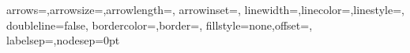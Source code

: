\newcommand{\VarLoopOff}{\RstLoopOffset \RstLoopSize \RstLoopAngle}
\newlength{\EdgeLineWid}
\setlength{\EdgeLineWid}{\EdgeLineWidth}
\newcommand{\EdgeLineSty}{\EdgeLineStyle}
\newcommand{\EdgeLineCol}{\EdgeLineColor}
\newcommand{\EdgeLabelSca}{1}
\newcommand{\EdgeLabelCol}{\EdgeLabelColor}
\newlength{\EdgeArrowSZDim}
\setlength{\EdgeArrowSZDim}{\EdgeArrowWidth}
\newcommand{\EdgeArrowSZNum}{\EdgeArrowLengthCoef}
\newcommand{\EdgeArrowSty}{\EdgeArrowStyle}
\newcommand{\EdgeArrowIns}{\EdgeArrowInset}
\newlength{\EdgeLineBord}\setlength{\EdgeLineBord}{0pt}
\newlength{\ZZSiZ}
\setlength{\ZZSiZ}{\ZZSize}%
\newcommand{\ZZLineWid}{\ZZLineWidth}%
\newlength{\EdgeOff}
\setlength{\EdgeOff}{\EdgeOffset}
\newcommand{\VaucArcAng}{\VaucArcAngle}
\newcommand{\VaucLArcAng}{\VaucLArcAngle}
\newlength{\VaucArcOff}\setlength{\VaucArcOff}{\VaucArcOffset}
\newcommand{\VaucArcCurv}{\VaucArcCurvature}
\newcommand{\VaucLArcCurv}{\VaucLArcCurvature}
\newcommand{\LoopAng}{\LoopAngle}
\newcommand{\CLoopAng}{\CLoopAngle}
\newcommand{\LoopVarAng}{\LoopVarAngle}
\newlength{\LoopOff}\setlength{\LoopOff}{\LoopOffset}
\newlength{\LoopVarOff}\setlength{\LoopVarOff}{\LoopVarOffset}
\newlength{\TransLabelSP}\setlength{\TransLabelSP}{\TransLabelSep}
\newcommand{\EdgeLabelPos}{\EdgeLabelPosit}
\newcommand{\ArcLabelPos}{\ArcLabelPosit}
\newcommand{\LArcLabelPos}{\LArcLabelPosit}
\newcommand{\LoopLabelPos}{\LoopLabelPosit}
\newcommand{\CLoopLabelPos}{\CLoopLabelPosit}
\newcommand{\InitStateLabelPos}{\InitStateLabelPosit}
\newcommand{\FinalStateLabelPos}{\FinalStateLabelPosit}
%
    {arrows=\EdgeArrowSty,arrowsize=\EdgeArrowSZDim,arrowlength=\EdgeArrowSZNum,%
         arrowinset=\EdgeArrowIns,%
     linewidth=\EdgeLineWid,linecolor=\EdgeLineCol,linestyle=\EdgeLineSty,%
     doubleline=false,%
         bordercolor=\EdgeLineBorderColor,border=\EdgeLineBord,%
     fillstyle=none,offset=\EdgeOff,%
     labelsep=\TransLabelSP,nodesep=0pt}
%
